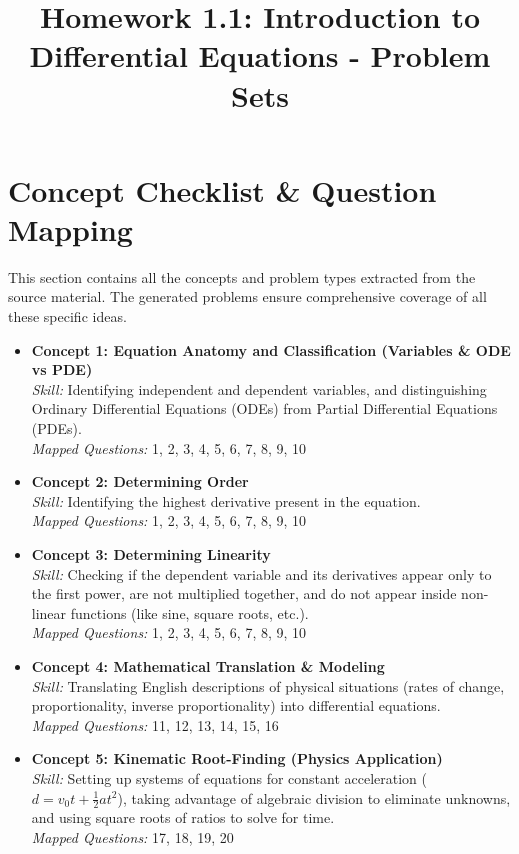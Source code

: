 \documentclass{article}
\title{Homework 1.1: Introduction to Differential Equations - Problem Sets}
\author{}
\date{}
\begin{document}
\maketitle
\tableofcontents
\newpage

\section{Concept Checklist \& Question Mapping}
This section contains all the concepts and problem types extracted from the source material. The generated problems ensure comprehensive coverage of all these specific ideas.

\begin{itemize}
    \item \textbf{Concept 1: Equation Anatomy and Classification (Variables \& ODE vs PDE)} \\
    \textit{Skill:} Identifying independent and dependent variables, and distinguishing Ordinary Differential Equations (ODEs) from Partial Differential Equations (PDEs). \\
    \textit{Mapped Questions:} 1, 2, 3, 4, 5, 6, 7, 8, 9, 10
    
    \item \textbf{Concept 2: Determining Order} \\
    \textit{Skill:} Identifying the highest derivative present in the equation. \\
    \textit{Mapped Questions:} 1, 2, 3, 4, 5, 6, 7, 8, 9, 10
    
    \item \textbf{Concept 3: Determining Linearity} \\
    \textit{Skill:} Checking if the dependent variable and its derivatives appear only to the first power, are not multiplied together, and do not appear inside non-linear functions (like sine, square roots, etc.). \\
    \textit{Mapped Questions:} 1, 2, 3, 4, 5, 6, 7, 8, 9, 10
    
    \item \textbf{Concept 4: Mathematical Translation \& Modeling} \\
    \textit{Skill:} Translating English descriptions of physical situations (rates of change, proportionality, inverse proportionality) into differential equations. \\
    \textit{Mapped Questions:} 11, 12, 13, 14, 15, 16
    
    \item \textbf{Concept 5: Kinematic Root-Finding (Physics Application)} \\
    \textit{Skill:} Setting up systems of equations for constant acceleration ($d = v_0t + \frac{1}{2}at^2$), taking advantage of algebraic division to eliminate unknowns, and using square roots of ratios to solve for time. \\
    \textit{Mapped Questions:} 17, 18, 19, 20
    

\end{itemize}
\end{document}
